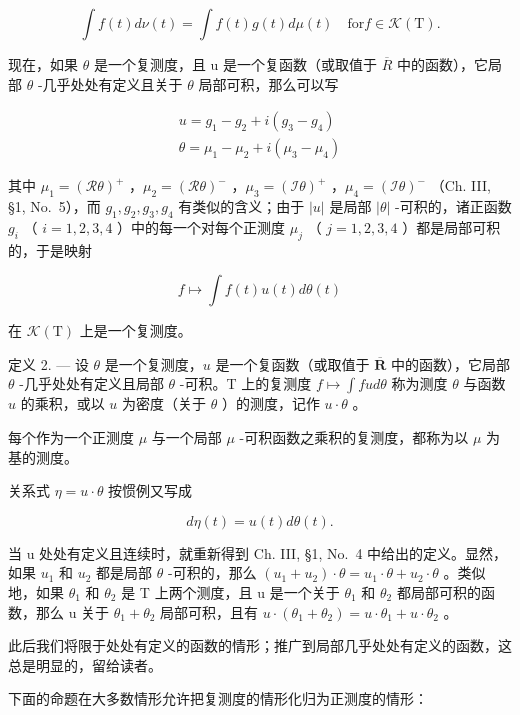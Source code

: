 \[
\int f (t) d \nu (t) = \int f (t) g (t) d \mu (t) \quad \mathrm{for} f \in \mathcal {K} (\mathrm{T}).\tag{1}
\]

现在，如果 \(\theta\) 是一个复测度，且 u 是一个复函数（或取值于 \(\overline{R}\) 中的函数），它局部 \(\theta\) -几乎处处有定义且关于 \(\theta\) 局部可积，那么可以写

\[
\begin{array}{l} {u = g _ {1} - g _ {2} + i (g _ {3} - g _ {4})} \\ {\theta = \mu_ {1} - \mu_ {2} + i (\mu_ {3} - \mu_ {4})} \end{array}\tag{2}
\]

其中 \(\mu_{1} = (\mathcal{R}\theta)^{+}\) ，\(\mu_{2} = (\mathcal{R}\theta)^{-}\) ，\(\mu_{3} = (\mathcal{I}\theta)^{+}\) ，\(\mu_{4} = (\mathcal{I}\theta)^{-}\) （Ch. III, §1, No.~5），而 \(g_{1}, g_{2}, g_{3}, g_{4}\) 有类似的含义；由于 \(|u|\) 是局部 \(|\theta|\) -可积的，诸正函数 \(g_{i}\) （ \(i = 1, 2, 3, 4\) ）中的每一个对每个正测度 \(\mu_{j}\) （ \(j = 1, 2, 3, 4\) ）都是局部可积的，于是映射

\[
f \mapsto \int f (t) u (t) d \theta (t)
\]

在 \(\mathcal{K}(\mathrm{T})\) 上是一个复测度。

定义 2. --- 设 \(\theta\) 是一个复测度，\(u\) 是一个复函数（或取值于 \(\overline{\mathbf{R}}\) 中的函数），它局部 \(\theta\) -几乎处处有定义且局部 \(\theta\) -可积。T 上的复测度 \(f \mapsto \int f u d\theta\) 称为测度 \(\theta\) 与函数 \(u\) 的乘积，或以 \(u\) 为密度（关于 \(\theta\) ）的测度，记作 \(u \cdot \theta\) 。

每个作为一个正测度 \(\mu\) 与一个局部 \(\mu\) -可积函数之乘积的复测度，都称为以 \(\mu\) 为基的测度。

关系式 \(\eta = u \cdot \theta\) 按惯例又写成

\[
d \eta (t) = u (t) d \theta (t).
\]

当 u 处处有定义且连续时，就重新得到 Ch. III, §1, No.~4 中给出的定义。显然，如果 \(u_{1}\) 和 \(u_{2}\) 都是局部 \(\theta\) -可积的，那么 \((u_{1}+u_{2})\cdot\theta=u_{1}\cdot\theta+u_{2}\cdot\theta\) 。类似地，如果 \(\theta_{1}\) 和 \(\theta_{2}\) 是 T 上两个测度，且 u 是一个关于 \(\theta_{1}\) 和 \(\theta_{2}\) 都局部可积的函数，那么 u 关于 \(\theta_{1}+\theta_{2}\) 局部可积，且有 \(u\cdot(\theta_{1}+\theta_{2})=u\cdot\theta_{1}+u\cdot\theta_{2}\) 。

此后我们将限于处处有定义的函数的情形；推广到局部几乎处处有定义的函数，这总是明显的，留给读者。

下面的命题在大多数情形允许把复测度的情形化归为正测度的情形：

